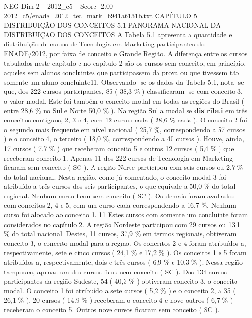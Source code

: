 \begin{textsample}{NEG Dim 2 – 2012\_c5 – Score -2.00 – 2012\_c5/enade\_2012\_tec\_mark\_b941a6131b.txt}  \label{ex:f2_neg_074}
CAPÍTULO 5 DISTRIBUIÇÃO DOS CONCEITOS 5.1 PANORAMA NACIONAL DA DISTRIBUIÇÃO DOS CONCEITOS A Tabela 5.1 apresenta a quantidade e distribuição de cursos de Tecnologia em Marketing participantes do ENADE/2012, por faixa de conceito e Grande Região.
A diferença entre os cursos tabulados neste capítulo e no capítulo 2 são os cursos sem conceito, em princípio, aqueles sem alunos concluintes que participassem da prova ou que tivessem tão somente um aluno concluinte11.
Observando -se os dados da Tabela 5.1, nota -se que, dos 222 cursos participantes, 85 ( 38,3 \% ) classificaram -se com conceito 3, o valor modal.
Este foi também o conceito modal em todas as regiões do Brasil ( entre 28,6 \% no Sul e Norte 50,0 \% ).
Na região Sul a modal se \textbf{distribui} em três conceitos contíguos, 2, 3 e 4, com 12 cursos cada ( 28,6 \% cada ).
O conceito 2 foi o segundo mais frequente em nível nacional ( 25,7 \%, correspondendo a 57 cursos ) e o conceito 4, o terceiro ( 18,0 \%, correspondendo a 40 cursos ).
Houve, ainda, 17 cursos ( 7,7 \% ) que receberam conceito 5 e outros 12 cursos ( 5,4 \% ) que receberam conceito 1.
Apenas 11 dos 222 cursos de Tecnologia em Marketing ficaram sem conceito ( SC ).
A região Norte participou com seis cursos ou 2,7 \% do total nacional.
Nesta região, como já comentado, o conceito modal 3 foi atribuído a três cursos dos seis participantes, o que equivale a 50,0 \% do total regional.
Nenhum curso ficou sem conceito ( SC ).
Os demais foram avaliados com conceitos 2, 4 e 5, com um curso cada correspondendo a 16,7 \%.
Nenhum curso foi alocado ao conceito 1. 11 Estes cursos com somente um concluinte foram considerados no capítulo 2.
A região Nordeste participou com 29 cursos ou 13,1 \% do total nacional.
Destes, 11 cursos, 37,9 \% em termos regionais, obtiveram conceito 3, o conceito modal para a região.
Os conceitos 2 e 4 foram atribuídos a, respectivamente, sete e cinco cursos ( 24,1 \% e 17,2 \% ).
Os conceitos 1 e 5 foram atribuídos a, respectivamente, dois e três cursos ( 6,9 \% e 10,3 \% ).
Nessa região tampouco, apenas um dos cursos ficou sem conceito ( SC ).
Dos 134 cursos participantes da região Sudeste, 54 ( 40,3 \% ) obtiveram conceito 3, o conceito modal.
O conceito 1 foi atribuído a sete cursos ( 5,2 \% ) e o conceito 2, a 35 ( 26,1 \% ). 20 cursos ( 14,9 \% ) receberam o conceito 4 e nove outros ( 6,7 \% ) receberam o conceito 5.
Outros nove cursos ficaram sem conceito ( SC ).

\end{textsample}
